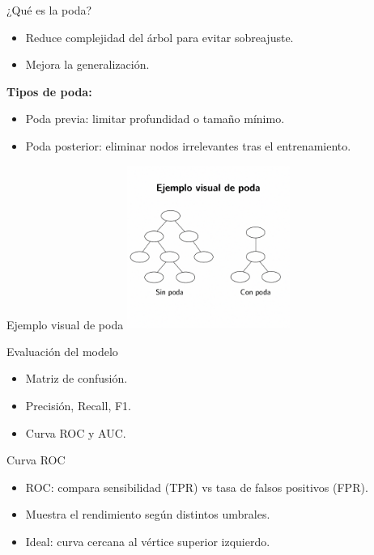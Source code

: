 \documentclass{beamer}
\begin{document}
\begin{frame}{¿Qué es la poda?}
\begin{itemize}
    \item Reduce complejidad del árbol para evitar sobreajuste.
    \item Mejora la generalización.
\end{itemize}
\textbf{Tipos de poda:}
\begin{itemize}
    \item Poda previa: limitar profundidad o tamaño mínimo.
    \item Poda posterior: eliminar nodos irrelevantes tras el entrenamiento.
\end{itemize}
\end{frame}

\begin{frame}{Ejemplo visual de poda}
\centering
\includegraphics[width=0.4\textwidth]{example-tree.png}
\end{frame}

\begin{frame}{Evaluación del modelo}
\begin{itemize}
    \item Matriz de confusión.
    \item Precisión, Recall, F1.
    \item Curva ROC y AUC.
\end{itemize}
\end{frame}

\begin{frame}{Curva ROC}
\begin{itemize}
    \item ROC: compara sensibilidad (TPR) vs tasa de falsos positivos (FPR).
    \item Muestra el rendimiento según distintos umbrales.
    \item Ideal: curva cercana al vértice superior izquierdo.
\end{itemize}
\end{frame}
\end{document}
